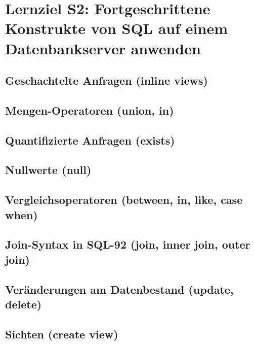 \section{Lernziel S2: Fortgeschrittene Konstrukte von SQL auf einem Datenbankserver anwenden}

\subsection{Geschachtelte Anfragen (inline views)}
\subsection{Mengen-Operatoren (union, in)}
\subsection{Quantifizierte Anfragen (exists)}
\subsection{Nullwerte (null)}
\subsection{Vergleichsoperatoren (between, in, like, case when)}
\subsection{Join-Syntax in SQL-92 (join, inner join, outer join)}
\subsection{Veränderungen am Datenbestand (update, delete)}
\subsection{Sichten (create view)}